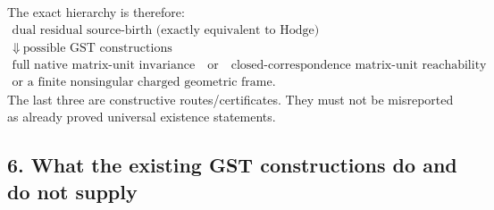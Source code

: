 The exact hierarchy is therefore:
\[
\begin{array}{c}
\text{dual residual source-birth (exactly equivalent to Hodge)}
\\[2mm]
\Downarrow\ \text{possible GST constructions}
\\[2mm]
\text{full native matrix-unit invariance}
\quad\text{or}\quad
\text{closed-correspondence matrix-unit reachability}
\\[2mm]
\text{or a finite nonsingular charged geometric frame}.
\end{array}
\]
The last three are constructive routes/certificates. They must not be
misreported as already proved universal existence statements.

\subsection*{6. What the existing GST constructions do and do not supply}

